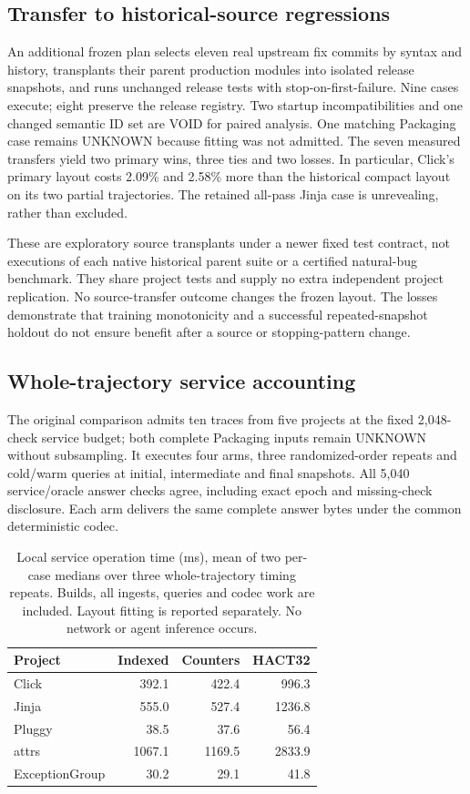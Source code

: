 \subsection{Transfer to historical-source regressions}
An additional frozen plan selects eleven real upstream fix commits by
syntax and history, transplants their parent production modules into
isolated release snapshots, and runs unchanged release tests with
stop-on-first-failure. Nine cases execute; eight preserve the release
registry. Two startup incompatibilities and one changed semantic ID set
are VOID for paired analysis. One matching Packaging case remains UNKNOWN
because fitting was not admitted. The seven measured transfers yield
two primary wins, three ties and two losses. In particular, Click's
primary layout costs 2.09\% and 2.58\% more than the historical compact layout
on its two partial trajectories. The retained all-pass Jinja case is
unrevealing, rather than excluded.

These are exploratory source transplants under a newer fixed test contract,
not executions of each native historical parent suite or a certified
natural-bug benchmark. They share project tests and supply no extra
independent project replication. No source-transfer outcome changes the
frozen layout. The losses demonstrate that training monotonicity and a
successful repeated-snapshot holdout do not ensure benefit after a source
or stopping-pattern change.

\subsection{Whole-trajectory service accounting}
The original comparison admits ten traces from five projects at the fixed 2,048-check
service budget; both complete Packaging inputs remain UNKNOWN without
subsampling. It executes four arms, three randomized-order repeats and
cold/warm queries at initial, intermediate and final snapshots.
All 5,040 service/oracle answer checks agree,
including exact epoch and missing-check disclosure. Each arm delivers the
same complete answer bytes under the common deterministic codec.

\begin{table}[t]\centering\footnotesize
\caption{Local service operation time (ms), mean of two per-case medians over
three whole-trajectory timing repeats. Builds, all ingests, queries and
codec work are included. Layout fitting is reported separately.
No network or agent inference occurs.}\label{tab:v11-time}
\begin{tabular}{@{}lrrr@{}}\toprule
Project & Indexed & Counters & HACT32\\\midrule
Click & 392.1 & 422.4 & 996.3 \\
Jinja & 555.0 & 527.4 & 1236.8 \\
Pluggy & 38.5 & 37.6 & 56.4 \\
attrs & 1067.1 & 1169.5 & 2833.9 \\
ExceptionGroup & 30.2 & 29.1 & 41.8 \\
\bottomrule\end{tabular}
\end{table}

